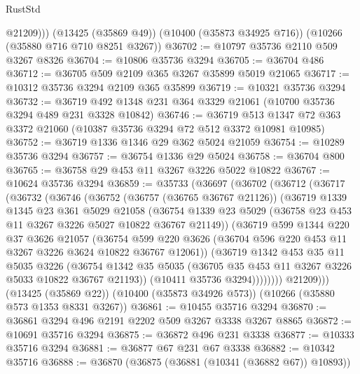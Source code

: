 \begin{lexlean}{RustStd}
\begin{coremodule}
{\begin{coremodule}
{{{{{{{{{{{{{{{{{{{{{{{{{          @21209)))
    (@13425 (@35869 @49))
    (@10400 (@35873 @34925 @716))
    (@10266 (@35880 @716 @710 @8251 @3267))
@36702 := @10797 @35736 @2110 @509 @3267 @8326
@36704 := @10806 @35736 @3294
@36705 := @36704 @486
@36712 := @36705 @509 @2109 @365 @3267 @35899 @5019 @21065
@36717 := @10312 @35736 @3294 @2109 @365 @35899
@36719 := @10321 @35736 @3294
@36732 := @36719 @492 @1348 @231 @364 @3329 @21061 (@10700 @35736 @3294 @489 @231 @3328 @10842)
@36746 := @36719 @513 @1347 @72 @363 @3372 @21060 (@10387 @35736 @3294 @72 @512 @3372 @10981 @10985)
@36752 := @36719 @1336 @1346 @29 @362 @5024 @21059
@36754 := @10289 @35736 @3294
@36757 := @36754 @1336 @29 @5024
@36758 := @36704 @800
@36765 := @36758 @29 @453 @11 @3267 @3226 @5022 @10822
@36767 := @10624 @35736 @3294
@36859 := @35733
    (@36697
      (@36702
        (@36712
          (@36717
            (@36732
              (@36746
                (@36752
                  (@36757 (@36765 @36767 @21126))
                  (@36719
                    @1339
                    @1345
                    @23
                    @361
                    @5029
                    @21058
                    (@36754
                      @1339
                      @23
                      @5029
                      (@36758 @23 @453 @11 @3267 @3226 @5027 @10822 @36767 @21149))
                    (@36719
                      @599
                      @1344
                      @220
                      @37
                      @3626
                      @21057
                      (@36754
                        @599
                        @220
                        @3626
                        (@36704 @596 @220 @453 @11 @3267 @3226 @3624 @10822 @36767 @12061))
                      (@36719
                        @1342
                        @453
                        @35
                        @11
                        @5035
                        @3226
                        (@36754
                          @1342
                          @35
                          @5035
                          (@36705 @35 @453 @11 @3267 @3226 @5033 @10822 @36767 @21193))
                        (@10411 @35736 @3294))))))))
          @21209)))
    (@13425 (@35869 @22))
    (@10400 (@35873 @34926 @573))
    (@10266 (@35880 @573 @1353 @8331 @3267))
@36861 := @10455 @35716 @3294
@36870 := @36861 @3294 @496 @2191 @2202 @509 @3267 @3338 @3267 @8865
@36872 := @10691 @35716 @3294
@36875 := @36872 @496 @231 @3338
@36877 := @10333 @35716 @3294
@36881 := @36877 @67 @231 @67 @3338
@36882 := @10342 @35716
@36888 := @36870 (@36875 (@36881 (@10341 (@36882 @67)) @10893))
}}}}}}}}}}}}}}}}}}}}}}}}}
\end{coremodule}}
\end{coremodule}
\end{lexlean}
